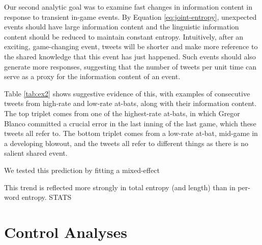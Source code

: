 \documentclass[11pt,letterpaper]{article}
\begin{document}
Our second analytic goal was to examine fast changes in information content in response to transient in-game events. By Equation \ref{eq:joint-entropy}, unexpected events should have large information content and the linguistic information content should be reduced to maintain constant entropy. Intuitively, after an exciting, game-changing event, tweets will be shorter and make more reference to the shared knowledge that this event has just happened. Such events should also generate more responses, suggesting that the number of tweets per unit time can serve as a proxy for the information content of an event.

Table \ref{tab:ex2} shows suggestive evidence of this, with examples of consecutive tweets from high-rate and low-rate at-bats, along with their information content. The top triplet comes from one of the highest-rate at-bats, in which Gregor Blanco committed a crucial error in the last inning of the last game, which these tweets all refer to.  The bottom triplet comes from a low-rate at-bat, mid-game in a developing blowout, and the tweets all refer to different things as there is no salient shared event.


We tested this prediction by fitting a mixed-effect 

This trend is reflected more strongly in total entropy (and length) than in per-word entropy. STATS

\section{Control Analyses}
\end{document}
